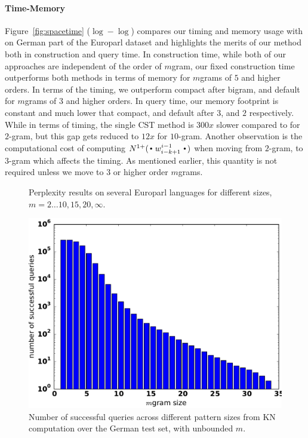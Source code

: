 \paragraph{Time-Memory}
Figure~\ref{fig:spacetime} ($\log-\log$) compares our timing and memory usage with \SRILM on German part of the Europarl dataset and highlights the merits of our method both in construction and query time. In construction time, while both of our approaches are independent of the order of $m$gram, our fixed construction time outperforms both \SRILM methods in terms of memory for $m$grams of $5$ and higher orders. In terms of the timing, we outperform \SRILM compact after bigram, and \SRILM default for $m$grams of $3$ and higher orders. In query time, our memory footprint is constant and much lower that \SRILM compact, and default after $3$, and $2$ respectively. While in terms of timing, the single CST method is $300x$ slower compared to \SRILM for $2$-gram, but this gap gets reduced to $12x$ for $10$-gram.  Another observation is the computational cost of computing $\nlplus{\Bigcdot w_{i-k+1}^{i-1} \Bigcdot}$ when moving from $2$-gram, to $3$-gram which affects the timing. As mentioned earlier, this quantity is not required unless we move to $3$ or higher order $m$grams.

\begin{figure}[tb]

\caption{Perplexity results on several Europarl languages for different \ngram sizes, $m=2\ldots10,15,20,\infty$.}
\label{fig:pplx}
\end{figure}

\begin{figure}[tb]
\includegraphics[width=\columnwidth]{figures/german_pattern_size.pdf}
\caption{Number of successful queries across different pattern sizes from KN computation over the German test set, with unbounded $m$.}
\label{fig:germanpattern}
\end{figure}

